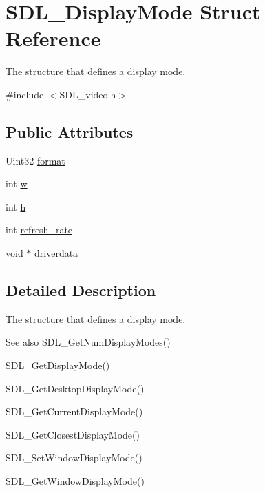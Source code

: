 \hypertarget{structSDL__DisplayMode}{\section{S\+D\+L\+\_\+\+Display\+Mode Struct Reference}
\label{structSDL__DisplayMode}
}


The structure that defines a display mode.  




{\ttfamily \#include $<$S\+D\+L\+\_\+video.\+h$>$}

\subsection*{Public Attributes}
\begin{DoxyCompactItemize}
\item 
Uint32 \hyperlink{structSDL__DisplayMode_ae8120e0a18a99992f039756e1b503680}{format}
\item 
int \hyperlink{structSDL__DisplayMode_a504bb5e21950b719a0df43be51199046}{w}
\item 
int \hyperlink{structSDL__DisplayMode_a0d9eabed50a560ed553af772c26632d7}{h}
\item 
int \hyperlink{structSDL__DisplayMode_ad1b5783c9b292ebf24ad4e0e7a98e540}{refresh\+\_\+rate}
\item 
void $\ast$ \hyperlink{structSDL__DisplayMode_abc8ae3922fa84e6411834c1a7877e36d}{driverdata}
\end{DoxyCompactItemize}


\subsection{Detailed Description}
The structure that defines a display mode. 

\begin{DoxySeeAlso}{See also}
S\+D\+L\+\_\+\+Get\+Num\+Display\+Modes() 

S\+D\+L\+\_\+\+Get\+Display\+Mode() 

S\+D\+L\+\_\+\+Get\+Desktop\+Display\+Mode() 

S\+D\+L\+\_\+\+Get\+Current\+Display\+Mode() 

S\+D\+L\+\_\+\+Get\+Closest\+Display\+Mode() 

S\+D\+L\+\_\+\+Set\+Window\+Display\+Mode() 

S\+D\+L\+\_\+\+Get\+Window\+Display\+Mode() 
\end{DoxySeeAlso}


